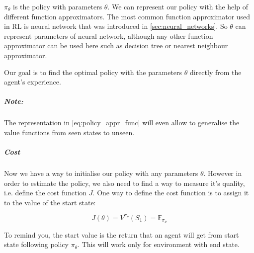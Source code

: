 $\pi_{\theta}$ is the policy with parameters $\theta$. We can represent our policy
with the help of different function approximators. The most common function
approximator used in RL is neural network that was introduced in \autoref{sec:neural_networks}.
So $\theta$ can represent parameters of neural network, although any other function approximator
can be used here such as decision tree or nearest neighbour approximator.

Our goal is to find the optimal policy with the parameters $\theta$
directly from the agent's experience.


\subparagraph{Note:}
The representation in \ref{eq:policy_appr_func} will even allow to generalise
the value functions from seen states to unseen.

%








\subparagraph{Cost} Now we have a way to initialise our policy with any parameters $\theta$.
However in order to estimate the policy, we also need to find a way
to measure it's quality, i.e. define the cost function $J$.
One way to define the cost function is to assign it
to the value of the start state:

\begin{equation}
	J(\theta) = V^{\pi_{\theta}}(S_1) = \mathbb{E}_{\pi_{\theta}}
\end{equation}



To remind you, the start value is the return that an agent will get from start state
following policy $\pi_{\theta}$. This will work only for environment with end state.


